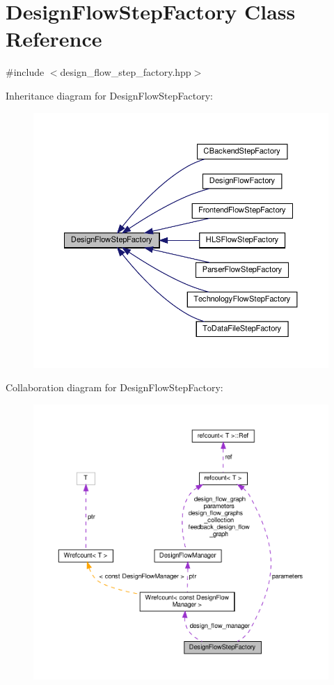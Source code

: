 \hypertarget{classDesignFlowStepFactory}{}\section{Design\+Flow\+Step\+Factory Class Reference}
\label{classDesignFlowStepFactory}


{\ttfamily \#include $<$design\+\_\+flow\+\_\+step\+\_\+factory.\+hpp$>$}



Inheritance diagram for Design\+Flow\+Step\+Factory\+:
\nopagebreak
\begin{figure}[H]
\begin{center}
\leavevmode
\includegraphics[width=350pt]{da/def/classDesignFlowStepFactory__inherit__graph}
\end{center}
\end{figure}


Collaboration diagram for Design\+Flow\+Step\+Factory\+:
\nopagebreak
\begin{figure}[H]
\begin{center}
\leavevmode
\includegraphics[width=350pt]{d9/d1c/classDesignFlowStepFactory__coll__graph}
\end{center}
\end{figure}
